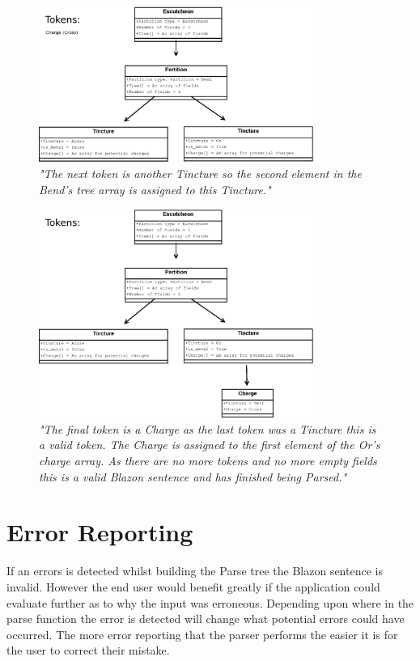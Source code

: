 \begin{figure}[H]
  \centering
    \includegraphics[width=0.8\textwidth]{parsing/images/Parsing2.eps}
  \caption{\emph{"The next token is another Tincture so the second element in the Bend's tree array is assigned to this Tincture."}}
  
\end{figure}

\begin{figure}[H]
  \centering
    \includegraphics[width=0.8\textwidth]{parsing/images/Parsing1.eps}
  \caption{\emph{"The final token is a Charge as the last token was a Tincture this is a valid token.  The Charge is assigned to the first element of the Or's charge array. As there are no more tokens and no more empty fields this is a valid Blazon sentence and has finished being Parsed."}}
  
\end{figure}

\section{Error Reporting}

If an errors is detected whilst building the Parse tree the Blazon sentence is invalid.  However the end user would benefit greatly if the application could evaluate further as to why the input was erroneous.  Depending upon where in the parse function the error is detected will change what potential errors could have occurred.  The more error reporting that the parser performs the easier it is for the user to correct their mistake. 

